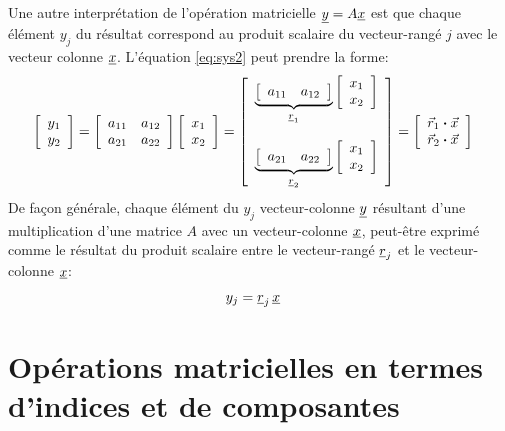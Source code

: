 Une autre interprétation de l'opération matricielle $\underline{y} = A \underline{x}$ est que chaque élément $y_j$ du résultat correspond au produit scalaire du vecteur-rangé $j$ avec le vecteur colonne $\underline{x}$. L'équation \eqref{eq:sys2} peut prendre la forme:
%
\begin{align}
\left[ \begin{array}{c} 
	y_1 \\ y_2
\end{array} \right] &= 
\left[ \begin{array}{c c} 
a_{11} & a_{12} \\ a_{21} & a_{22}
\end{array} \right]
\left[ \begin{array}{c} 
	x_1 \\ x_2
\end{array} \right] = 
\left[ \begin{array}{c} 
\underbrace{
\left[ \begin{array}{c c} 
a_{11} & a_{12} 
\end{array} \right]
}_{\underline{r}_1}
\left[ \begin{array}{c} 
	x_1 \\ x_2
\end{array} \right] 
	\\ \\
\underbrace{
\left[ \begin{array}{c c} 
a_{21} & a_{22} 
\end{array} \right]
}_{\underline{r}_2}
\left[ \begin{array}{c} 
	x_1 \\ x_2
\end{array} \right] 
\end{array} \right] 
= 
\left[ \begin{array}{c} 
\vec{r}_1 \boldsymbol{\cdot} \vec{x}
\\
\vec{r}_2 \boldsymbol{\cdot} \vec{x}
\end{array} \right]
\end{align}
%
De façon générale, chaque élément du $y_j$ vecteur-colonne $\underline{y}$ résultant d'une multiplication d'une matrice $A$ avec un vecteur-colonne $\underline{x}$, peut-être exprimé comme le résultat du produit scalaire entre le vecteur-rangé $\underline{r}_j$ et le vecteur-colonne $\underline{x}$:
%
\begin{align}
y_j
&= \underline{r}_j \, \underline{x}
\end{align}
%


\section{Opérations matricielles en termes d'indices et de composantes}
\label{sec:opmatind}

